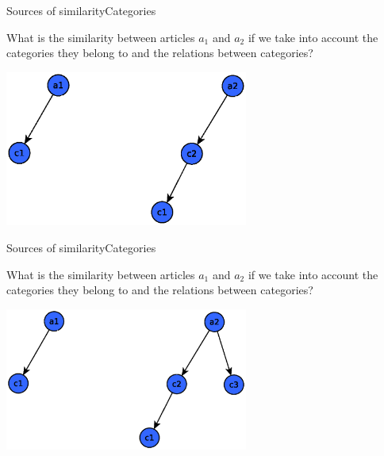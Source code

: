 \documentclass[xcolor=dvipsnames]{beamer}
\begin{document}
\begin{frame}{Sources of similarity}{Categories}


What is the similarity between articles $a_1$ and $a_2$  if we take into account the categories they belong to and the relations between categories?


\begin{center}

\includegraphics[width=0.6\textwidth, height=0.4\paperheight]{media/sim1.eps}

\end{center}

\end{frame}


\begin{frame}{Sources of similarity}{Categories}

What is the similarity between articles $a_1$ and $a_2$  if we take into account the categories they belong to and the relations between categories?

\begin{center}

\includegraphics[width=0.6\textwidth, height=0.4\paperheight]{media/sim1.1.eps}

\end{center}

\end{frame}
\end{document}
